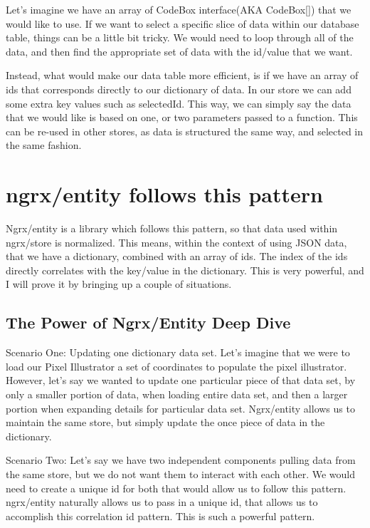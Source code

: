 Let's imagine we have an array of CodeBox interface(AKA CodeBox[]) that we would
like to use. If we want to select a specific slice of data within our database
table, things can be a little bit tricky. We would need to loop through all of
the data, and then find the appropriate set of data with the id/value that we
want.

Instead, what would make our data table more efficient, is if we have an array
of ids that corresponds directly to our dictionary of data. In our store we can
add some extra key values such as selectedId. This way, we can simply say the
data that we would like is based on one, or two parameters passed to a function.
This can be re-used in other stores, as data is structured the same way, and
selected in the same fashion.

\section{ngrx/entity follows this pattern}
Ngrx/entity is a library which follows this pattern, so that data used within
ngrx/store is normalized. This means, within the context of using JSON data,
that we have a dictionary, combined with an array of ids. The index of the ids
directly correlates with the key/value in the dictionary. This is very powerful,
and I will prove it by bringing up a couple of situations.

\subsection{The Power of Ngrx/Entity Deep Dive}
Scenario One:
Updating one dictionary data set. Let's imagine that we were to load our
Pixel Illustrator a set of coordinates to populate the pixel illustrator. However,
let's say we wanted to update one particular piece of that data set, by only
a smaller portion of data, when loading entire data set, and then a larger portion
when expanding details for particular data set. Ngrx/entity allows us to maintain
the same store, but simply update the once piece of data in the dictionary.

Scenario Two: 
Let's say we have two independent components pulling data from the same store,
but we do not want them to interact with each other. We would need to create a
unique id for both that would allow us to follow this pattern. ngrx/entity
naturally allows us to pass in a unique id, that allows us to accomplish this
correlation id pattern. This is such a powerful pattern.

